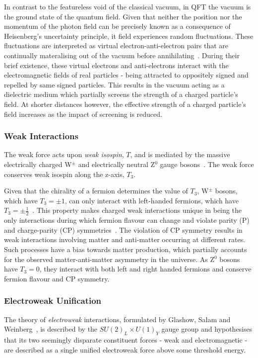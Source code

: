 In contrast to the featureless void of the classical vacuum, in QFT the vacuum is the ground state of the quantum field.
Given that neither the position nor the momentum of the photon field can be precisely known as a consequence of Heisenberg's uncertainty principle, it field experiences random fluctuations.
These fluctuations are interpreted as virtual electron-anti-electron pairs that are continually materalising out of the vacuum before annihilating~\cite{coughlan2006ideas}.
During their brief existence, these virtual electrons and anti-electrons interact with the electromagnetic fields of real particles - being attracted to oppositely signed and repelled by same signed particles.
This results in the vacuum acting as a dielectric medium which partially screens the strength of a charged particle's field.
At shorter distances however, the effective strength of a charged particle's field increases as the impact of screening is reduced.

\subsubsection{Weak Interactions}\label{subsec:weakForce}
The weak force acts upon \emph{weak isospin}, $T$, and is mediated by the massive electrically charged W$^{\pm}$ and electrically neutral Z$^{0}$ gauge bosons~\cite{ElectroweakStrong}.
The weak force conserves weak isospin along the z-axis, $T_{3}$.

Given that the chirality of a fermion determines the value of $T_{3}$, W$^{\pm}$ bosons, which have $T_{3} = \pm 1$, can only interact with left-handed fermions, which have $T_{3} = \pm \frac{1}{2}$~\cite{Cheng:1985bj}.
This property makes charged weak interactions unique in being the only interactions during which fermion flavour can change and violate parity (P)~\cite{Lee:1956qn,Wu:1957my} and charge-parity (CP) symmetries~\cite{Christenson:1964fg}.
The violation of CP symmetry results in weak interactions involving matter and anti-matter occurring at different rates.
Such processes have a bias towards matter production, which partially accounts for the observed matter-anti-matter asymmetry in the universe.
As Z$^{0}$ bosons have $T_{3} = 0$, they interact with both left and right handed fermions and conserve fermion flavour and CP symmetry.

\subsubsection{Electroweak Unification}\label{subsec:electroweak}
The theory of \emph{electroweak} interactions, formulated by Glashow, Salam and Weinberg~\cite{Glashow:1961tr,Salam:1964ry,Weinberg:1967tq}, is described by the $SU(2)_{L} \times U(1)_{Y}$ gauge group and hypothesises that its two seemingly disparate constituent forces - weak and electromagnetic - are described as a single unified electroweak force above some threshold energy.


